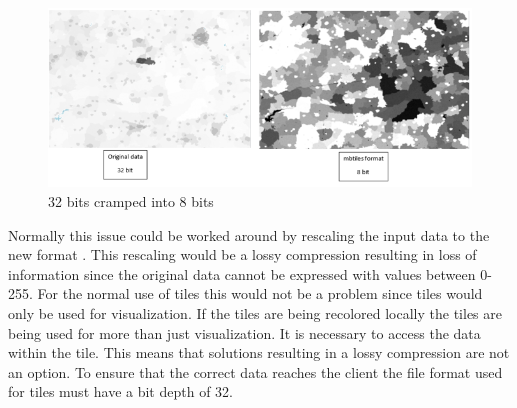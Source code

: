 \begin{figure} [H]
	\centering
	\includegraphics[width=.6\textwidth]{Pictures/WhyNot8Bit}
	\caption{32 bits cramped into 8 bits}
	\label{WhyNot8Bit}
\end{figure}

Normally this issue could be worked around by rescaling the input data to the new format \citep{gdal2tilesDoc} . This rescaling would be a lossy compression resulting in loss of information since the original data cannot be expressed with values between 0-255. \citep{Dent}
For the normal use of tiles this would not be a problem since tiles would only be used for visualization. 
If the tiles are being recolored locally the tiles are being used for more than just visualization. It is necessary to access the data within the tile. This means that solutions resulting in a lossy compression are not an option. To ensure that the correct data reaches the client the file format used for tiles must have a bit depth of 32.